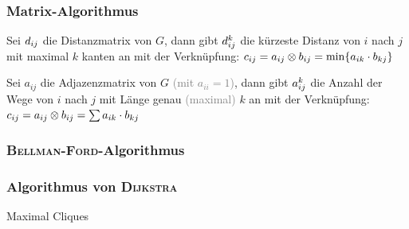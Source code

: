 \subsubsection{Matrix-Algorithmus}
Sei $d_{i\smash{j}}$ die Distanzmatrix von $G$, dann gibt $d_{i\smash{j}}^k$ die kürzeste Distanz von $i$ nach $j$ mit maximal $k$ kanten an mit der Verknüpfung: $c_{i\smash{j}} = a_{i\smash{j}} \otimes b_{i\smash{j}} = \min\{a_{ik} \cdot b_{k\smash{j}}\}$


Sei $a_{ij}$ die Adjazenzmatrix von $G$ \textcolor{gray}{(mit $a_{ii} = 1$)}, dann gibt $a_{i\smash{j}}^k$ die Anzahl der Wege von $i$ nach $j$ mit Länge genau \textcolor{gray}{(maximal)} $k$ an mit der Verknüpfung: $c_{i\smash{j}} = a_{i\smash{j}} \otimes b_{i\smash{j}} = \sum a_{ik} \cdot b_{k\smash{j}}$

\subsubsection{\textsc{Bellman-Ford}-Algorithmus}

\subsubsection{Algorithmus von \textsc{Dijkstra}}

\vfill\null\columnbreak


\begin{algorithm}{Maximal Cliques}
	\begin{methods}
	\end{methods}
\end{algorithm}

